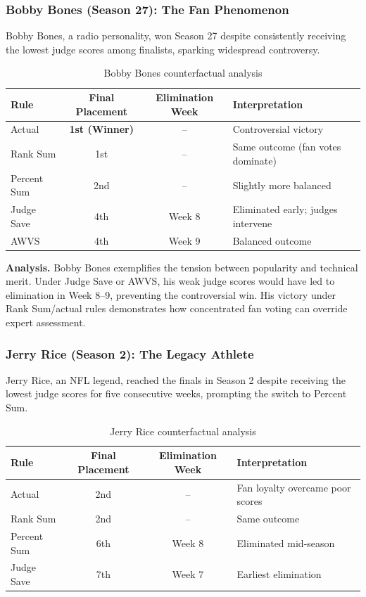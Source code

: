 \documentclass{mcmthesis}
\begin{document}
\subsubsection{Bobby Bones (Season 27): The Fan Phenomenon}

Bobby Bones, a radio personality, won Season 27 despite consistently receiving the lowest judge scores among finalists, sparking widespread controversy.

\begin{table}[h]
\centering
\caption{Bobby Bones counterfactual analysis}
\begin{tabular}{l c c l}
\toprule
Rule & Final Placement & Elimination Week & Interpretation \\
\midrule
Actual & \textbf{1st (Winner)} & -- & Controversial victory \\
Rank Sum & 1st & -- & Same outcome (fan votes dominate) \\
Percent Sum & 2nd & -- & Slightly more balanced \\
Judge Save & 4th & Week 8 & Eliminated early; judges intervene \\
AWVS & 4th & Week 9 & Balanced outcome \\
\bottomrule
\end{tabular}
\end{table}

\textbf{Analysis.} Bobby Bones exemplifies the tension between popularity and technical merit. Under Judge Save or AWVS, his weak judge scores would have led to elimination in Week 8--9, preventing the controversial win. His victory under Rank Sum/actual rules demonstrates how concentrated fan voting can override expert assessment.

\subsubsection{Jerry Rice (Season 2): The Legacy Athlete}

Jerry Rice, an NFL legend, reached the finals in Season 2 despite receiving the lowest judge scores for five consecutive weeks, prompting the switch to Percent Sum.

\begin{table}[h]
\centering
\caption{Jerry Rice counterfactual analysis}
\begin{tabular}{l c c l}
\toprule
Rule & Final Placement & Elimination Week & Interpretation \\
\midrule
Actual & 2nd & -- & Fan loyalty overcame poor scores \\
Rank Sum & 2nd & -- & Same outcome \\
Percent Sum & 6th & Week 8 & Eliminated mid-season \\
Judge Save & 7th & Week 7 & Earliest elimination \\
\bottomrule
\end{tabular}
\end{table}
\end{document}
